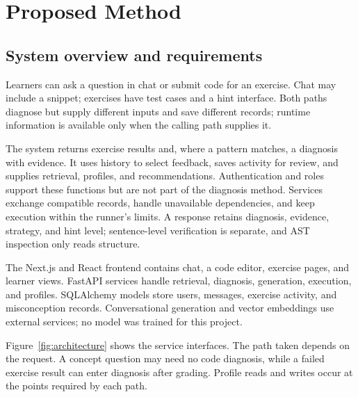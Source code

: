\chapter{Proposed Method}
\label{ch:method}

\section{System overview and requirements}
Learners can ask a question in chat or submit code for an exercise. Chat may include a snippet; exercises have test cases and a hint interface. Both paths diagnose but supply different inputs and save different records; runtime information is available only when the calling path supplies it.

The system returns exercise results and, where a pattern matches, a diagnosis with evidence. It uses history to select feedback, saves activity for review, and supplies retrieval, profiles, and recommendations. Authentication and roles support these functions but are not part of the diagnosis method. Services exchange compatible records, handle unavailable dependencies, and keep execution within the runner's limits. A response retains diagnosis, evidence, strategy, and hint level; sentence-level verification is separate, and AST inspection only reads structure.

\label{sec:architecture}
The Next.js and React frontend contains chat, a code editor, exercise pages, and learner views. FastAPI services handle retrieval, diagnosis, generation, execution, and profiles. SQLAlchemy models store users, messages, exercise activity, and misconception records. Conversational generation and vector embeddings use external services; no model was trained for this project.

Figure~\ref{fig:architecture} shows the service interfaces. The path taken depends on the request. A concept question may need no code diagnosis, while a failed exercise result can enter diagnosis after grading. Profile reads and writes occur at the points required by each path.

